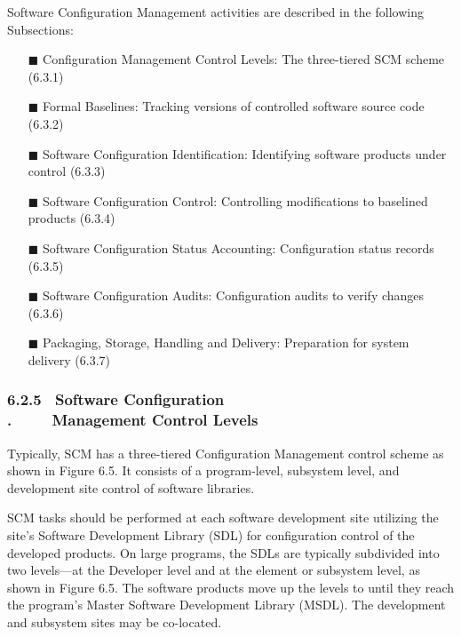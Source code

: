 \documentclass[10pt,twocolumn]{article}
\begin{document}
Software Configuration Management activities are
described in the following Subsections:



\begin{itemize}
	\item [$\blacksquare$]
	 Configuration Management Control Levels: The
three-tiered SCM scheme (6.3.1)
\item [$\blacksquare$]
 Formal Baselines: Tracking versions of controlled software source code (6.3.2)
\item [$\blacksquare$]
 Software Configuration Identification: Identifying
software products under control (6.3.3)
\item [$\blacksquare$]
 Software Configuration Control: Controlling modifications to baselined products (6.3.4)
\item [$\blacksquare$]
Software Configuration Status Accounting:
Configuration status records (6.3.5)
\item [$\blacksquare$]
 Software Configuration Audits: Configuration audits
to verify changes (6.3.6)
\item [$\blacksquare$]
 Packaging, Storage, Handling and Delivery:
Preparation for system delivery (6.3.7)
\end{itemize}




\subsubsection*{6.2.5 $\,$ Software Configuration\\{\color{white}.} $\qquad$ Management Control Levels}

Typically, SCM has a three-tiered Configuration Management
control scheme as shown in Figure 6.5. It consists of a program-level, subsystem level, and development site control of
software libraries.





SCM tasks should be performed at each software development site utilizing the site’s Software Development Library
(SDL) for configuration control of the developed products.
On large programs, the SDLs are typically subdivided into
two levels—at the Developer level and at the element or subsystem level, as shown in Figure 6.5. The software products
move up the levels to until they reach the program’s Master
Software Development Library (MSDL). The development
and subsystem sites may be co-located.
\end{document}
